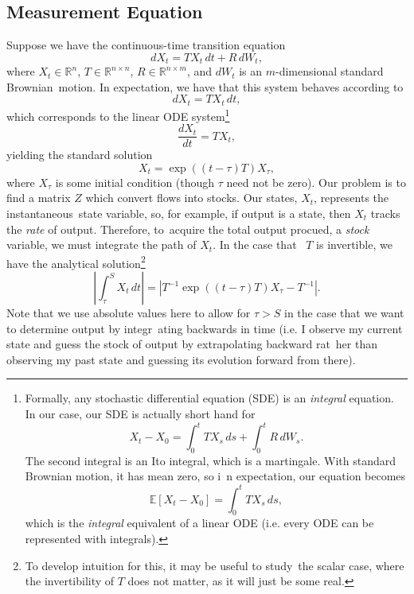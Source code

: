 \documentclass[12 pt, oneside]{article}
\theoremstyle{definition}
\theoremstyle{definition}
\theoremstyle{definition}
\newcommand{\R}{\mathbb{R}}
\newcommand{\E}{\mathbb{E}}
\begin{document}
\subsection{Measurement Equation}
Suppose we have the continuous-time transition equation
\[dX_t = TX_t\,dt + R\, dW_t,  \]
where $X_t\in \R^n$, $T\in \R^{n\times n}$, $R\in \R^{n\times m}$, and $dW_t$ is an $m$-dimensional standard Brownian\
 motion. In expectation, we have that this system behaves according to
\[ dX_t = TX_t\,dt, \]
which corresponds to the linear ODE system\footnote{Formally, any stochastic differential equation (SDE) is an \textit{integral} equation. In our case, our SDE is actually short hand for
\[X_t - X_0 = \int_0^t TX_s\, ds + \int_0^t R\, dW_s.  \]
The second integral is an Ito integral, which is a martingale. With standard Brownian motion, it has mean zero, so i\
n expectation, our equation becomes
\[\E[X_t - X_0] = \int_0^t TX_s\,ds,  \]
which is the \textit{integral} equivalent of a linear ODE (i.e. every ODE can be represented with integrals).
}
\[ \dfrac{dX_t}{dt} = TX_t, \]
yielding the standard solution
\[ X_t = \exp((t-\tau)T)X_\tau, \]
where $X_\tau$ is some initial condition (though $\tau$ need not be zero).
Our problem is to find a matrix $Z$ which convert flows into stocks. Our states, $X_t$, represents the instantaneous\
 state variable, so, for example, if output is a state, then $X_t$ tracks the \textit{rate} of output. Therefore, to\
 acquire the total output procued, a \textit{stock} variable, we must integrate the path of $X_t$. In the case that \
$T$ is invertible, we have the analytical solution\footnote{To develop intuition for this, it may be useful to study\
 the scalar case, where the invertibility of $T$ does not matter, as it will just be some real.}
\[\left| \int_\tau^S X_t\, dt\right| = \left|T^{-1}\exp((t-\tau)T)X_\tau - T^{-1}\right|. \]
Note that we use absolute values here to allow for $\tau > S$ in the case that we want to determine output by integr\
ating backwards in time (i.e. I observe my current state and guess the stock of output by extrapolating backward rat\
her than observing my past state and guessing its evolution forward from there).
\end{document}

